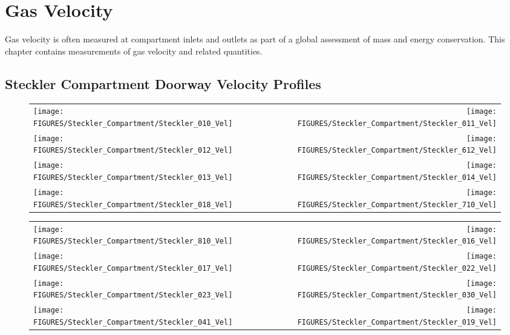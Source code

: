 \chapter{Gas Velocity}

Gas velocity is often measured at compartment inlets and outlets as part of a global assessment of mass and
energy conservation.  This chapter contains measurements of gas velocity and related quantities.

\section{Steckler Compartment Doorway Velocity Profiles}



\begin{figure}[p]
\begin{tabular*}{\textwidth}{l@{\extracolsep{\fill}}r}
\texttt{[image: FIGURES/Steckler\_Compartment/Steckler\_010\_Vel]} &
\texttt{[image: FIGURES/Steckler\_Compartment/Steckler\_011\_Vel]} \\
\texttt{[image: FIGURES/Steckler\_Compartment/Steckler\_012\_Vel]} &
\texttt{[image: FIGURES/Steckler\_Compartment/Steckler\_612\_Vel]} \\
\texttt{[image: FIGURES/Steckler\_Compartment/Steckler\_013\_Vel]} &
\texttt{[image: FIGURES/Steckler\_Compartment/Steckler\_014\_Vel]} \\
\texttt{[image: FIGURES/Steckler\_Compartment/Steckler\_018\_Vel]} &
\texttt{[image: FIGURES/Steckler\_Compartment/Steckler\_710\_Vel]}
\end{tabular*}
\label{Steckler_Vel_1}
\end{figure}

\begin{figure}[p]
\begin{tabular*}{\textwidth}{l@{\extracolsep{\fill}}r}
\texttt{[image: FIGURES/Steckler\_Compartment/Steckler\_810\_Vel]} &
\texttt{[image: FIGURES/Steckler\_Compartment/Steckler\_016\_Vel]} \\
\texttt{[image: FIGURES/Steckler\_Compartment/Steckler\_017\_Vel]} &
\texttt{[image: FIGURES/Steckler\_Compartment/Steckler\_022\_Vel]} \\
\texttt{[image: FIGURES/Steckler\_Compartment/Steckler\_023\_Vel]} &
\texttt{[image: FIGURES/Steckler\_Compartment/Steckler\_030\_Vel]} \\
\texttt{[image: FIGURES/Steckler\_Compartment/Steckler\_041\_Vel]} &
\texttt{[image: FIGURES/Steckler\_Compartment/Steckler\_019\_Vel]}
\end{tabular*}
\label{Steckler_Vel_2}
\end{figure}


